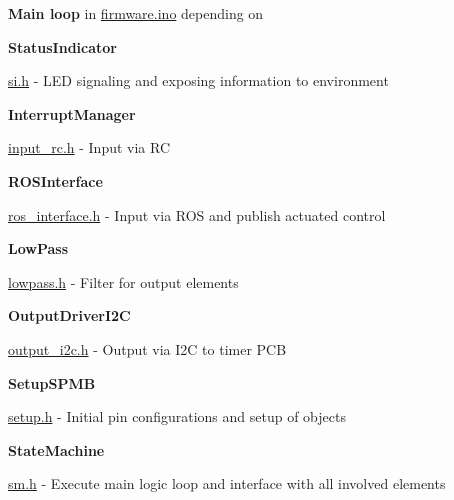\begin{DoxyItemize}
\item {\bfseries Main loop} in \hyperlink{firmware_8ino_source}{firmware.\+ino} depending on
\begin{DoxyItemize}
\item {\bfseries Status\+Indicator}
\begin{DoxyItemize}
\item \hyperlink{si_8h_source}{si.\+h} -\/ L\+ED signaling and exposing information to environment
\end{DoxyItemize}
\item {\bfseries Interrupt\+Manager}
\begin{DoxyItemize}
\item \hyperlink{input__rc_8h_source}{input\+\_\+rc.\+h} -\/ Input via RC
\end{DoxyItemize}
\item {\bfseries R\+O\+S\+Interface}
\begin{DoxyItemize}
\item \hyperlink{ros__interface_8h_source}{ros\+\_\+interface.\+h} -\/ Input via R\+OS and publish actuated control
\end{DoxyItemize}
\item {\bfseries Low\+Pass}
\begin{DoxyItemize}
\item \hyperlink{lowpass_8h_source}{lowpass.\+h} -\/ Filter for output elements
\end{DoxyItemize}
\item {\bfseries Output\+Driver\+I2C}
\begin{DoxyItemize}
\item \hyperlink{output__i2c_8h_source}{output\+\_\+i2c.\+h} -\/ Output via I2C to timer P\+CB
\end{DoxyItemize}
\item {\bfseries Setup\+S\+P\+MB}
\begin{DoxyItemize}
\item \hyperlink{setup_8h_source}{setup.\+h} -\/ Initial pin configurations and setup of objects
\end{DoxyItemize}
\item {\bfseries State\+Machine}
\begin{DoxyItemize}
\item \hyperlink{sm_8h_source}{sm.\+h} -\/ Execute main logic loop and interface with all involved elements
\end{DoxyItemize}
\end{DoxyItemize}
\end{DoxyItemize}

